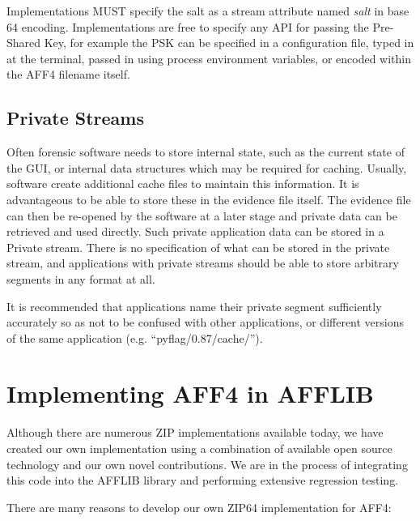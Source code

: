 \documentclass[10pt, conference]{IEEEtran}
\begin{document}
Implementations MUST specify the salt as a stream attribute named {\em
salt} in base 64 encoding. Implementations are free to specify any API
for passing the Pre-Shared Key, for example the PSK can be specified
in a configuration file, typed in at the terminal, passed in using
process environment variables, or encoded within the AFF4 filename
itself.

\subsection{Private Streams}
Often forensic software needs to store internal state, such as the
current state of the GUI, or internal data structures which may be
required for caching. Usually, software create additional cache files
to maintain this information. It is advantageous to be able to store
these in the evidence file itself. The evidence file can then be
re-opened by the software at a later stage and private data can be
retrieved and used directly. Such private application data can be
stored in a Private stream. There is no specification of what can be
stored in the private stream, and applications with private streams
should be able to store arbitrary segments in any format at all.

It is recommended that applications name their private segment
sufficiently accurately so as not to be confused with other
applications, or different versions of the same application
(e.g. ``pyflag/0.87/cache/'').



\section{Implementing AFF4 in AFFLIB}
Although there are numerous ZIP implementations available
today, we have created our own implementation using a combination of
available open source technology and our own novel contributions. We
are in the process of integrating this code into the AFFLIB library
and performing extensive regression testing. 

There are many reasons to develop our own ZIP64 implementation for
AFF4:
\end{document}
